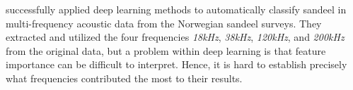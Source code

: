 
    \citet{brautaset2020acoustic} successfully applied deep learning methods to automatically classify sandeel in multi-frequency  acoustic data from the Norwegian sandeel surveys. They extracted and utilized the four frequencies \textit{18kHz}, \textit{38kHz}, \textit{120kHz}, and \textit{200kHz} from the original data, but a problem within deep learning is that feature importance can be difficult to interpret. Hence, it is hard to establish precisely what frequencies contributed the most to their results.
    

    
